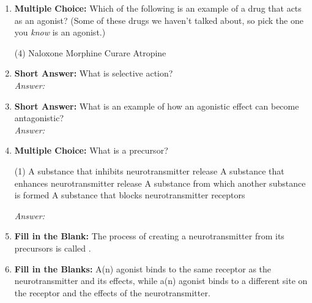 \begin{enumerate}[label=\textbf{Q3.1.\arabic*}]
    \item \textbf{Multiple Choice:} Which of the following is an example of a drug that acts as an agonist? (Some of these drugs we haven't talked about, so pick the one you \textit{know} is an agonist.)
        \begin{tasks}[label=\textcolor{\documentTheme}{(\Alph*)}, item-format=\color{\documentTheme}, label-width=1.5em, item-indent=1.7em](4)
            \task Naloxone
            \task Morphine
            \task Curare
            \task Atropine
        \end{tasks}

    \item \textbf{Short Answer:} What is selective action? \\
        \textit{Answer:} %

    \item \textbf{Short Answer:} What is an example of how an agonistic effect can become antagonistic? \\
        \textit{Answer:} %

        \newpage
    \item \textbf{Multiple Choice:} What is a precursor?
        \begin{tasks}[label=\textcolor{\documentTheme}{(\Alph*)}, item-format=\color{\documentTheme}, label-width=1.5em, item-indent=1.7em](1)
            \task A substance that inhibits neurotransmitter release
            \task A substance that enhances neurotransmitter release
            \task A substance from which another substance is formed
            \task A substance that blocks neurotransmitter receptors
        \end{tasks}
        \textit{Answer:} %

    \item \textbf{Fill in the Blank:} The process of creating a neurotransmitter from its precursors is called \underline{\hspace{3cm}}.

    \item \textbf{Fill in the Blanks:} A(n) \underline{\hspace{3cm}} agonist binds to the same receptor as the neurotransmitter and \underline{\hspace{3cm}} its effects, while a(n) \underline{\hspace{3cm}} agonist binds to a different site on the receptor and \underline{\hspace{3cm}} the effects of the neurotransmitter.


\end{enumerate}
